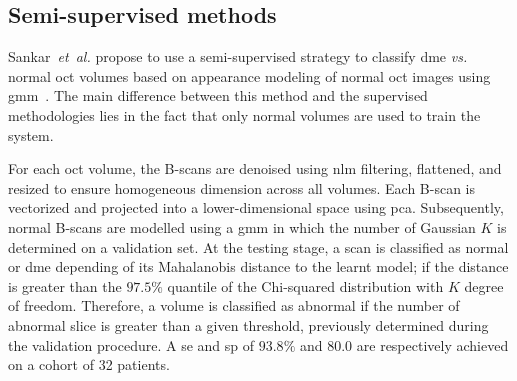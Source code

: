 \subsection{Semi-supervised methods}

Sankar~\textit{et~al.} propose to use a semi-supervised strategy to classify \gls{dme} \emph{vs.} normal \gls{oct} volumes based on appearance modeling of normal \gls{oct} images using \gls{gmm}~\cite{sankar2016classification}.
The main difference between this method and the supervised methodologies lies in the fact that only normal volumes are used to train the system.

For each \gls{oct} volume, the B-scans are denoised using \gls{nlm} filtering, flattened, and resized to ensure homogeneous dimension across all volumes.
Each B-scan is vectorized and projected into a lower-dimensional space using \gls{pca}.
Subsequently, normal B-scans are modelled using a \gls{gmm} in which the number of Gaussian $K$ is determined on a validation set.
At the testing stage, a scan is classified as normal or \gls{dme} depending of its Mahalanobis distance to the learnt model; if the distance is greater than the $97.5 \%$ quantile of the Chi-squared distribution with $K$ degree of freedom.
Therefore, a volume is classified as abnormal if the number of abnormal slice is greater than a given threshold, previously determined during the validation procedure.
A \gls{se} and \gls{sp} of $93.8 \%$ and $80.0$ are respectively achieved on a cohort of 32 patients.

